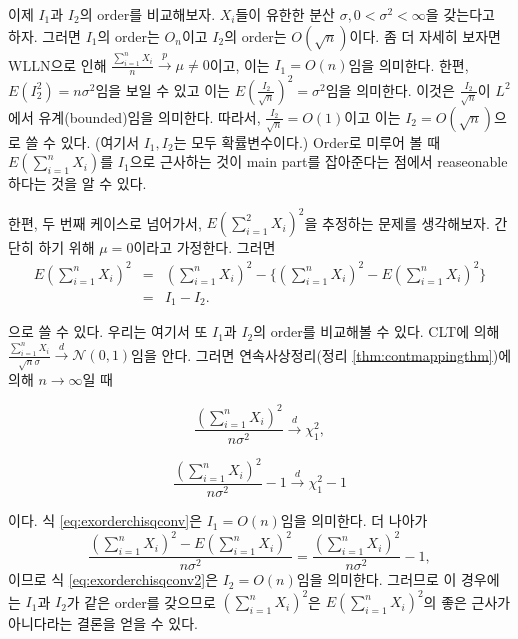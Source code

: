 \documentclass[b5paper,]{scrbook}
\theoremstyle{plain}
\theoremstyle{definition}
\numberwithin{equation}{section}
\begin{document}
이제 \(I_{1}\)과 \(I_{2}\)의 order를 비교해보자. \(X_{i}\)들이 유한한 분산 \(\sigma, 0<\sigma^{2}<\infty\)을 갖는다고 하자. 그러면 \(I_{1}\)의 order는 \(O_{n}\)이고 \(I_{2}\)의 order는 \(O(\sqrt{n})\)이다. 좀 더 자세히 보자면 WLLN으로 인해 \(\frac{\sum_{i=1}^{n}X_{i}}{n}\stackrel{p}{\rightarrow}\mu\neq 0\)이고, 이는 \(I_{1}=O(n)\)임을 의미한다. 한편, \(E(I_{2}^{2})=n\sigma^{2}\)임을 보일 수 있고 이는 \(E(\frac{I_{2}}{\sqrt{n}})^{2}=\sigma^{2}\)임을 의미한다. 이것은 \(\frac{I_{2}}{\sqrt{n}}\)이 \(L^{2}\)에서 유계(bounded)임을 의미한다. 따라서, \(\frac{I_{2}}{\sqrt{n}}=O(1)\)이고 이는 \(I_{2}=O(\sqrt{n})\)으로 쓸 수 있다. (여기서 \(I_{1}, I_{2}\)는 모두 확률변수이다.) Order로 미루어 볼 때 \(E(\sum_{i=1}^{n}X_{i})\)를 \(I_{1}\)으로 근사하는 것이 main part를 잡아준다는 점에서 reaseonable하다는 것을 알 수 있다.

한편, 두 번째 케이스로 넘어가서, \(E(\sum_{i=1}^{2}X_{i})^{2}\)을 추정하는 문제를 생각해보자. 간단히 하기 위해 \(\mu=0\)이라고 가정한다. 그러면
\[
\begin{eqnarray}
E(\sum_{i=1}^{n}X_{i})^{2}&=&(\sum_{i=1}^{n}X_{i})^{2}-\{ (\sum_{i=1}^{n}X_{i})^{2}-E(\sum_{i=1}^{n}X_{i})^{2}\}\\
&=&I_{1}-I_{2}.
\end{eqnarray}
\]

으로 쓸 수 있다. 우리는 여기서 또 \(I_{1}\)과 \(I_{2}\)의 order를 비교해볼 수 있다. CLT에 의해 \(\frac{\sum_{i=1}^{n}X_{i}}{\sqrt{n}\sigma}\stackrel{d}{\rightarrow}\mathcal{N}(0,1)\)임을 안다. 그러면 연속사상정리(정리 \ref{thm:contmappingthm})에 의해 \(n\rightarrow\infty\)일 때

\[
\begin{equation}
\frac{(\sum_{i=1}^{n}X_{i})^{2}}{n\sigma^{2}}\stackrel{d}{\rightarrow}\chi_{1}^{2},
\label{eq:exorderchisqconv}
\end{equation}
\]

\[
\begin{equation}
\frac{(\sum_{i=1}^{n}X_{i})^{2}}{n\sigma^{2}}-1 \stackrel{d}{\rightarrow}\chi_{1}^{2}-1
\label{eq:exorderchisqconv2}
\end{equation}
\]

이다. 식 \eqref{eq:exorderchisqconv}은 \(I_{1}=O(n)\)임을 의미한다. 더 나아가
\[\frac{(\sum_{i=1}^{n}X_{i})^{2}-E(\sum_{i=1}^{n}X_{i})^{2}}{n\sigma^{2}}=\frac{(\sum_{i=1}^{n}X_{i})^{2}}{n\sigma^{2}}-1,\]
이므로 식 \eqref{eq:exorderchisqconv2}은 \(I_{2}=O(n)\)임을 의미한다. 그러므로 이 경우에는 \(I_{1}\)과 \(I_{2}\)가 같은 order를 갖으므로 \((\sum_{i=1}^{n}X_{i})^{2}\)은 \(E(\sum_{i=1}^{n}X_{i})^{2}\)의 좋은 근사가 아니다라는 결론을 얻을 수 있다.
\end{document}
